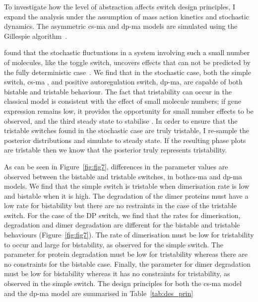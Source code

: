 To investigate how the level of abstraction affects switch design principles, I expand the analysis under the assumption of mass action kinetics and stochastic dynamics. The asymmetric \acrshort{cs-ma} and \acrshort{dp-ma} models are simulated using the Gillespie algorithm~\autocite{Gillespie:1977ww}.

\textcite{Ma:2012dt} found that the stochastic fluctuations in a system involving such a small number of molecules, like the toggle switch, uncovers effects that can not be predicted by the fully deterministic case~\autocite{Ma:2012dt}. We find that in the stochastic case, both the simple switch, \acrshort{cs-ma} , and positive autoregulation switch, \acrshort{dp-ma}, are capable of both bistable and tristable behaviour. The fact that tristability can occur in the classical model is consistent with the effect of small molecule numbers; if gene expression remains low, it provides the opportunity for small number effects to be observed, and the third steady state to stabilise \autocite{Ma:2012dt}. In order to ensure that the tristable switches found in the stochastic case are truly tristable, I re-sample the posterior distributions and simulate to steady state. If the resulting phase plots are tristable then we know that the posterior truly represents tristability. 

As can be seen in Figure~\ref{fig:fig7}, differences in the parameter values are observed between the bistable and tristable switches, in both\acrshort{cs-ma} and \acrshort{dp-ma} models. We find that the simple switch is tristable when dimerisation rate is low and bistable when it is high. The degradation of the dimer proteins must have a low rate for bistability but there are no restraints in the case of the tristable switch. For the case of the DP switch, we find that the rates for dimerisation, degradation and dimer degradation are different for the bistable and tristable behaviours (Figure~\ref{fig:fig7}). The rate of dimerisation must be low for tristability to occur and large for bistability, as observed for the simple switch. The parameter for protein degradation must be low for tristability whereas there are no constraints for the bistable case. Finally, the parameter for dimer degradation must be low for bistability whereas it has no constraints for tristability, as observed in the simple switch. The design principles for both the \acrshort{cs-ma} model and the \acrshort{dp-ma} model are summarised in Table~\ref{tab:des_prin}

